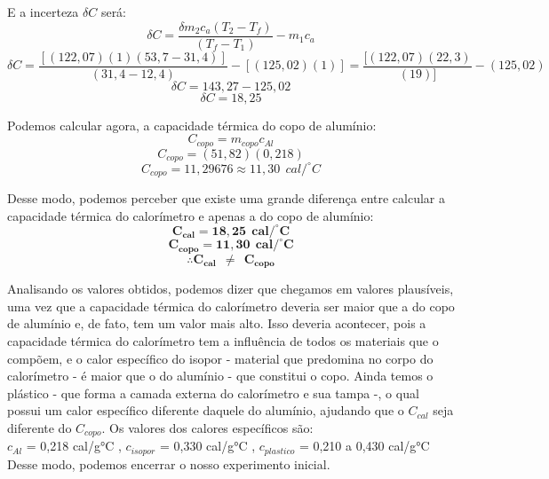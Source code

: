 E a incerteza  $\delta C$ será:
\[\delta C =  \frac{\delta m_2 c_a (T_2 - T_f) }{(T_f - T_1)} - m_1 c_a \]
\[\delta C =  \frac{[(122,07) (1) (53,7 - 31,4)]}{(31,4 - 12,4)} - [(125,02) (1)] =  \frac{[(122,07)(22,3) }{(19)]} - (125,02)\]
\[\delta C =  143,27 - 125,02\]
\[\delta C = 18,25\]

Podemos calcular agora, a capacidade térmica do copo de alumínio: 
\[C_{copo} = m_{copo} c_{Al}\]
\[C_{copo} = (51,82)(0,218) \]
\[C_{copo} = 11,29676 \approx 11,30 \ \ cal/^\circ C \]

Desse modo, podemos perceber que existe uma grande diferença entre calcular a capacidade térmica do calorímetro e apenas a do copo de alumínio:
\[\mathbf{C_{cal} = 18,25 \ \  cal/^\circ C }\]
\[\mathbf{C_{copo} = 11,30 \ \ cal/^\circ C}\]
\[\mathbf{\therefore C_{cal}\ \  \neq \ \  C_{copo}}\] 

Analisando os valores obtidos, podemos dizer que chegamos em valores plausíveis, uma vez que a capacidade térmica do calorímetro deveria ser maior que a do copo de alumínio e, de fato, tem um valor mais alto. Isso deveria acontecer, pois a capacidade térmica do calorímetro tem a influência de todos os materiais que o compõem, e o calor específico do isopor - material que predomina no corpo do calorímetro - é maior que o do alumínio - que constitui o copo. Ainda temos o plástico - que forma a camada externa do calorímetro e sua tampa -, o qual possui um calor específico diferente daquele do alumínio, ajudando que o $C_{cal}$ seja diferente do $C_{copo}$. Os valores dos calores específicos são:\\

$ c_{Al}$ = 0,218  cal/g°C  , $ c_{isopor}$ = 0,330  cal/g°C , $ c_{plastico}$ = 0,210 a 0,430 cal/g°C\\ %

Desse modo, podemos encerrar o nosso experimento inicial.\\
